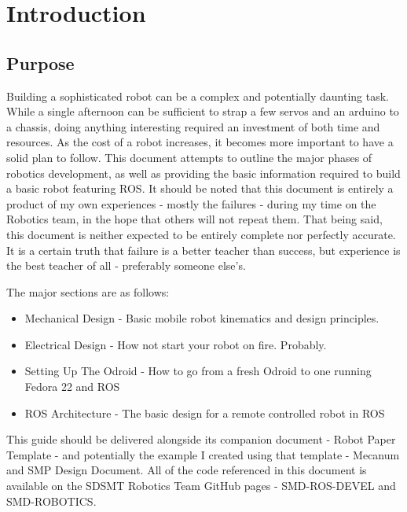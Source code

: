 
\chapter{Introduction}
\label{chap:intro}

\section{Purpose}
Building a sophisticated robot can be a complex and potentially daunting task. While a single afternoon can be sufficient to strap a few servos and an arduino to a chassis, doing anything interesting required an investment of both time and resources. As the cost of a robot increases, it becomes more important to have a solid plan to follow. This document attempts to outline the major phases of robotics development, as well as providing the basic information required to build a basic robot featuring ROS. It should be noted that this document is entirely a product of my own experiences - mostly the failures - during my time on the Robotics team, in the hope that others will not repeat them. That being said, this document is neither expected to be entirely complete nor perfectly accurate. It is a certain truth that failure is a better teacher than success, but experience is the best teacher of all - preferably someone else's.

The major sections are as follows:
\begin{itemize}
\item{Mechanical Design - Basic mobile robot kinematics and design principles.}
\item{Electrical Design - How not start your robot on fire. Probably.}
\item{Setting Up The Odroid - How to go from a fresh Odroid to one running Fedora 22 and ROS}
\item{ROS Architecture - The basic design for a remote controlled robot in ROS}
\end{itemize} 

This guide should be delivered alongside its companion document - Robot Paper Template - and potentially the example I created using that template - Mecanum and SMP Design Document. All of the code referenced in this document is available on the SDSMT Robotics Team GitHub pages - SMD-ROS-DEVEL and SMD-ROBOTICS. \\